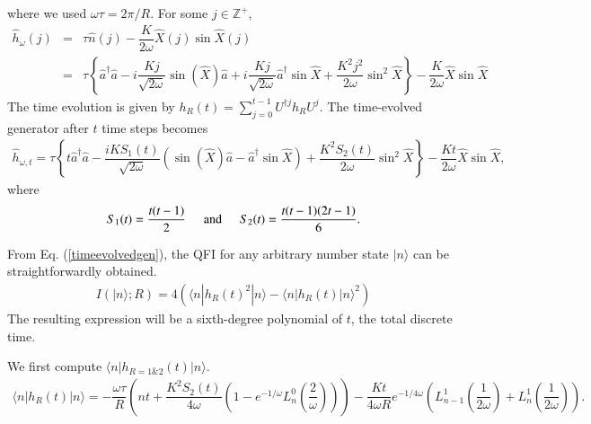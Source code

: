 \documentclass[amsmath,nobibnotes,aps,amssymb,pra, prl,aps,showpacs,superscriptaddress,twocolumn, longbibliography, reprint]{revtex4-2}
\begin{document}
where we used $\omega\tau=2\pi/R$. For some $j\in \mathbb{Z}^+$, 
\begin{eqnarray}
\hat{h}_{\omega}(j)&=&\tau \hat{n}(j)-\dfrac{K}{2\omega}\hat{X}(j)\sin\hat{X}(j)\nonumber\\
&=&\tau\left\{ \hat{a}^\dagger \hat{a} -i\dfrac{Kj}{\sqrt{2\omega}}\sin(\hat{X}) \hat{a}+i\dfrac{Kj}{\sqrt{2\omega}}\hat{a}^\dagger\sin\hat{X} +\dfrac{K^2j^2}{2\omega}\sin^2\hat{X} \right\}-\dfrac{K}{2\omega}\hat{X}\sin\hat{X}
\end{eqnarray}
The time evolution is given by $h_R(t)=\sum_{j=0}^{t-1}U^{\dagger j}h_RU^j$. The time-evolved generator after $t$ time steps becomes
\begin{eqnarray}\label{timeevolvedgen}
\hat{h}_{\omega, t}=\tau\left\{t\hat{a}^\dagger \hat{a} -\dfrac{iKS_1(t)}{\sqrt{2\omega}}\left(\sin (\hat{X}) \hat{a}-\hat{a}^\dagger\sin\hat{X}\right)+\dfrac{K^2S_2(t)}{2\omega}\sin^2 \hat{X} \right\}-\dfrac{Kt}{2\omega}\hat{X}\sin\hat{X} ,
\end{eqnarray}
where 
\begin{eqnarray*}
S_1(t)=\dfrac{t(t-1)}{2}\hspace{0.5cm}\text{and}\hspace{0.5cm}S_2(t)=\dfrac{t(t-1)(2t-1)}{6}. 
\end{eqnarray*}

From Eq. (\ref{timeevolvedgen}), the QFI for any arbitrary number state $|n\rangle$ can be straightforwardly obtained. 
\begin{eqnarray}
I(|n\rangle; R)=4\left( \langle n|h_{R}(t)^2|n\rangle-\langle n|h_R(t)|n\rangle^2 \right) 
\end{eqnarray}
The resulting expression will be a sixth-degree polynomial of $t$, the total discrete time. 

\iffalse
We first compute $\langle n|h_{R=1\&2}(t)|n\rangle$.
\begin{eqnarray}
\langle n|h_R(t)|n\rangle=-\dfrac{\omega\tau}{R}\left( nt+\dfrac{K^2S_2(t)}{4\omega}\left(1-e^{-1/\omega}L_n^0\left(\dfrac{2}{\omega}\right) \right)\right)-\dfrac{Kt}{4\omega R}e^{-1/4\omega}\left( L_{n-1}^1\left(\dfrac{1}{2\omega}\right)+L_{n}^1\left(\dfrac{1}{2\omega}\right) \right).
\end{eqnarray}
\end{document}
